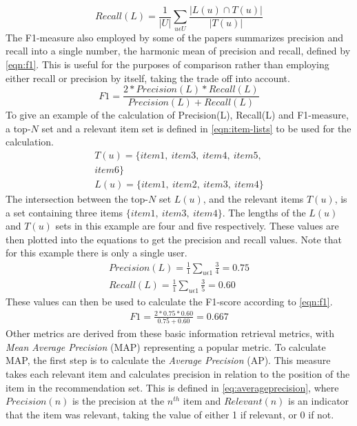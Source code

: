 \begin{equation}
    \label{eqn:recall}
    Recall(L) = \frac{1}{|U|} \sum\limits_{u \epsilon U} \frac{|L(u) \cap T(u)|}{|T(u)|}
\end{equation}
The F1-measure also employed by some of the papers summarizes precision and recall into a single number, the harmonic mean of precision and recall, defined by \autoref{eqn:f1}.
This is useful for the purposes of comparison rather than employing either recall or precision by itself, taking the trade off into account.
\begin{equation}
    \label{eqn:f1}
    F1 = \frac{2*Precision(L)*Recall(L)}{Precision(L)+Recall(L)}
\end{equation}
To give an example of the calculation of Precision(L), Recall(L) and F1-measure, a top-$N$ set and a relevant item set is defined in \autoref{eqn:item-lists} to be used for the calculation.
\begin{align}
    T(u) = \{item1, \: item3, \: item4, \: item5,\nonumber \\
     item6\} \nonumber \\
    L(u) = \{item1, \: item2, \: item3, \: item4\}\label{eqn:item-lists}
\end{align}
The intersection between the top-$N$ set $L(u)$, and the relevant items $T(u)$, is a set containing three items $\{item1, \: item3, \: item4\}$.
The lengths of the $L(u)$ and $T(u)$ sets in this example are four and five respectively.
These values are then plotted into the equations to get the precision and recall values.
Note that for this example there is only a single user.
\begin{align*}
    Precision(L) = \frac{1}{1} \sum\limits_{u \epsilon 1}\frac{3}{4} = 0.75\\
    Recall(L) = \frac{1}{1} \sum\limits_{u \epsilon 1} \frac{3}{5} = 0.60
\end{align*}
These values can then be used to calculate the F1-score according to \autoref{eqn:f1}.
\begin{align*}
    F1 = \frac{2*0.75*0.60}{0.75+0.60} = 0.667
\end{align*}
Other metrics are derived from these basic information retrieval metrics, with \textit{Mean Average Precision} (MAP) representing a popular metric\cite{ChoosingMetricsEvaluation}.
To calculate MAP, the first step is to calculate the \textit{Average Precision} (AP).
This measure takes each relevant item and calculates precision in relation to the position of the item in the recommendation set.
This is defined in \autoref{eq:averageprecision}, where $Precision(n)$ is the precision at the $n^{th}$ item and $Relevant(n)$ is an indicator that the item was relevant, taking the value of either 1 if relevant, or 0 if not.

